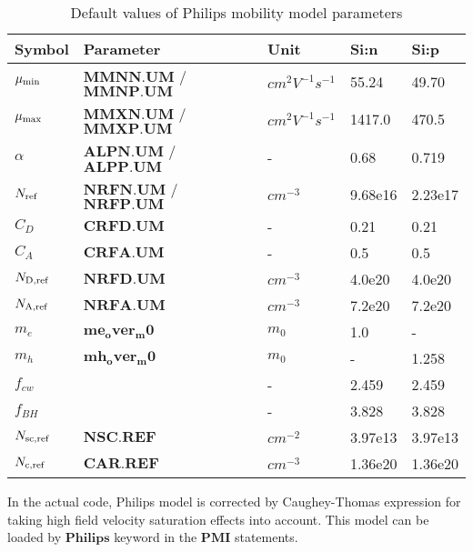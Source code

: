 \documentclass[oneside,12pt]{cgd_book}
\begin{document}
\par
\begin{longtable}{lllll}
\caption{\label{tab:Equation:Mobility:Philips:Param}Default values of Philips mobility model parameters} \\
\hline
 Symbol
& Parameter
& Unit
& Si:n
& Si:p\\
\hline
 $\mu_{\rm min}$
& $\mathbf{MMNN.UM}$ / $\mathbf{MMNP.UM}$
& $cm^2V^{-1}s^{-1}$
& 55.24
& 49.70
\\
 $\mu_{\rm max}$
& $\mathbf{MMXN.UM}$ / $\mathbf{MMXP.UM}$
& $cm^2V^{-1}s^{-1}$
& 1417.0
& 470.5
\\
 $\alpha$
& $\mathbf{ALPN.UM}$ / $\mathbf{ALPP.UM}$
& -
& 0.68
& 0.719
\\
 $N_{\rm ref}$
& $\mathbf{NRFN.UM}$ / $\mathbf{NRFP.UM}$
& $cm^{-3}$
& 9.68e16
& 2.23e17
\\
 $C_D$
& $\mathbf{CRFD.UM}$
& -
& 0.21
& 0.21
\\
 $C_A$
& $\mathbf{CRFA.UM}$
& -
& 0.5
& 0.5
\\
 $N_{\rm D,ref}$
& $\mathbf{NRFD.UM}$
& $cm^{-3}$
& 4.0e20
& 4.0e20
\\
 $N_{\rm A,ref}$
& $\mathbf{NRFA.UM}$
& $cm^{-3}$
& 7.2e20
& 7.2e20
\\
 $m_e$
& $\mathbf{me_over_m0}$
& $m_0$
& 1.0
& -
\\
 $m_h$
& $\mathbf{mh_over_m0}$
& $m_0$
& -
& 1.258
\\
 $f_{cw}$
&
& -
& 2.459
& 2.459
\\
 $f_{BH}$
&
& -
& 3.828
& 3.828
\\
 $N_{\rm sc, ref}$
& $\mathbf{NSC.REF}$
& $cm^{-2}$
& 3.97e13
& 3.97e13
\\
 $N_{\rm c,ref}$
& $\mathbf{CAR.REF}$
& $cm^{-3}$
& 1.36e20
& 1.36e20\\
\end{longtable}
In the actual code, Philips model is corrected by Caughey-Thomas expression for taking high field
          velocity saturation effects into account. This model can be loaded by
$\mathbf{Philips}$ keyword
          in the $\mathbf{PMI}$ statements.
\par
\end{document}
